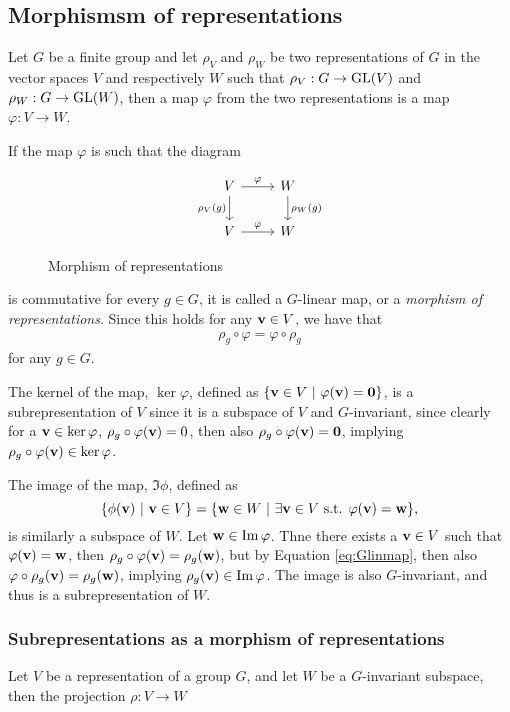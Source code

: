 \subsection{Morphismsm of representations}

Let $G$ be a finite group and let $\rho_V$ and $\rho_W$ be two representations of $G$ in the vector spaces $V$ and respectively $W$ such that $\rho_V: G \rightarrow \text{GL}(V)$ and $\rho_W: G \rightarrow \text{GL}(W)$, then a map $\varphi$ from the two representations is a map $\varphi:V \rightarrow W$.

If the map $\varphi$ is such that the diagram
\begin{figure}[hbt!]
	\centering
	\[\begin{tikzcd}
		V \arrow{r}{\varphi} \arrow[swap]{d}{\rho_V(g)} & W \arrow{d}{\rho_W(g)} \\
		V \arrow{r}{\varphi} & W
	\end{tikzcd}\]
	\caption{Morphism of representations}
	\label{fig:commapmorp}
\end{figure}

is commutative for every $g \in G$, it is called a $G$-linear map, or a \emph{morphism of representations}\cite{FultonHarris}. Since this holds for any $\mathbf{v} \in V$, we have that
\begin{align}\label{eq:Glinmap}
	\rho_g \circ \varphi = \varphi \circ \rho_g
\end{align}
for any $g \in G$.

The kernel of the map, $\ker \varphi$, defined as $\{\mathbf{v} \in V \ | \ \varphi(\mathbf{v}) = \mathbf{0}\}$, is a subrepresentation of $V$ since it is a subspace of $V$ \cite{Holst} and $G$-invariant, since clearly for a $\mathbf{v} \in \ker \varphi$, $\rho_g \circ \varphi(\mathbf{v}) = 0$, then also $\rho_g \circ \varphi(\mathbf{v}) = \mathbf{0}$, implying $\rho_g \circ \varphi(\mathbf{v}) \in \ker \varphi$.

The image of the map, $\Im \phi$, defined as $$\{ \phi(\mathbf{v}) \ | \ \mathbf{v} \in V \} = \{ \mathbf{w} \in W \ | \ \exists \mathbf{v} \in V \text{ s.t. } \varphi(\mathbf{v}) = \mathbf{w} \},$$ is similarly a subspace of $W$. Let $\mathbf{w} \in \Im \varphi$. Thne there exists a $\mathbf{v} \in V$ such that $\varphi(\mathbf{v})=\mathbf{w}$, then $\rho_g \circ \varphi (\mathbf{v}) = \rho_g(\mathbf{w})$, but by Equation \ref{eq:Glinmap}, then also $\varphi \circ \rho_g(\mathbf{v}) = \rho_g (\mathbf{w})$, implying $\rho_g(\mathbf{v}) \in \Im \varphi$. The image is also $G$-invariant, and thus is a subrepresentation of $W$.

\subsubsection{Subrepresentations as a morphism of representations}

Let $V$ be a representation of a group $G$, and let $W$ be a $G$-invariant subspace, then the projection $\rho: V \rightarrow W$ 


